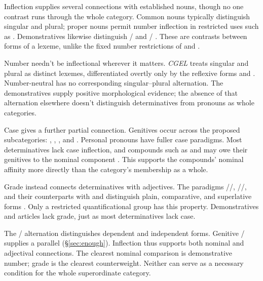 \documentclass[12pt]{article}
\begin{document}
Inflection supplies several connections with established nouns, though no one contrast runs through the whole category. Common nouns typically distinguish singular and plural; proper nouns permit number inflection in restricted uses such as . Demonstratives likewise distinguish / and / \citep[373, 521]{huddleston2002}. These are contrasts between forms of a lexeme, unlike the fixed number restrictions of  and .

Number needn't be inflectional wherever it matters. \textit{CGEL} treats singular and plural  as distinct lexemes, differentiated overtly only by the reflexive forms  and  \citep[486]{huddleston2002}. Number-neutral  has no corresponding singular--plural alternation. The demonstratives supply positive morphological evidence; the absence of that alternation elsewhere doesn't distinguish determinatives from pronouns as whole categories.

Case gives a further partial connection. Genitives occur across the proposed subcategories: , , , and . Personal pronouns have fuller case paradigms. Most determinatives lack case inflection, and compounds such as  and  may owe their genitives to the nominal component \citep[423--424, 479--480]{huddleston2002}. This supports the compounds' nominal affinity more directly than the category's membership as a whole.

Grade instead connects determinatives with adjectives. The paradigms /\allowbreak{}/\allowbreak{}, /\allowbreak{}/\allowbreak{}, and their counterparts with  and  distinguish plain, comparative, and superlative forms \citep[391--395]{huddleston2002}. Only a restricted quantificational group has this property. Demonstratives and articles lack grade, just as most determinatives lack case.

The /\allowbreak{} alternation distinguishes dependent and independent forms. Genitive /\allowbreak{} supplies a parallel (§\ref{sec:enough}). Inflection thus supports both nominal and adjectival connections. The clearest nominal comparison is demonstrative number; grade is the clearest counterweight. Neither can serve as a necessary condition for the whole superordinate category.
\end{document}

